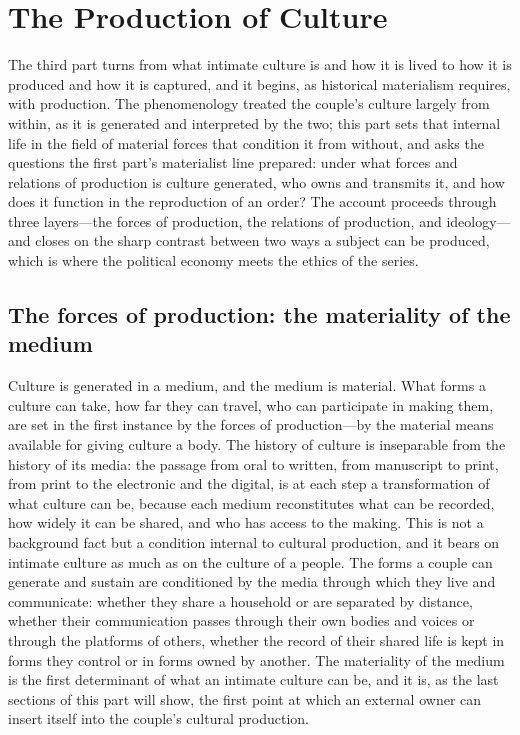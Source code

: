 \section{The Production of Culture}
\label{p24:sec:production}

\noindent
The third part turns from what intimate culture is and how it is lived to how it is produced and how it is captured, and it begins, as historical materialism requires, with production. The phenomenology treated the couple's culture largely from within, as it is generated and interpreted by the two; this part sets that internal life in the field of material forces that condition it from without, and asks the questions the first part's materialist line prepared: under what forces and relations of production is culture generated, who owns and transmits it, and how does it function in the reproduction of an order? The account proceeds through three layers---the forces of production, the relations of production, and ideology---and closes on the sharp contrast between two ways a subject can be produced, which is where the political economy meets the ethics of the series.

\subsection*{The forces of production: the materiality of the medium}

Culture is generated in a medium, and the medium is material. What forms a culture can take, how far they can travel, who can participate in making them, are set in the first instance by the forces of production---by the material means available for giving culture a body. The history of culture is inseparable from the history of its media: the passage from oral to written, from manuscript to print, from print to the electronic and the digital, is at each step a transformation of what culture can be, because each medium reconstitutes what can be recorded, how widely it can be shared, and who has access to the making. This is not a background fact but a condition internal to cultural production, and it bears on intimate culture as much as on the culture of a people. The forms a couple can generate and sustain are conditioned by the media through which they live and communicate: whether they share a household or are separated by distance, whether their communication passes through their own bodies and voices or through the platforms of others, whether the record of their shared life is kept in forms they control or in forms owned by another. The materiality of the medium is the first determinant of what an intimate culture can be, and it is, as the last sections of this part will show, the first point at which an external owner can insert itself into the couple's cultural production.

